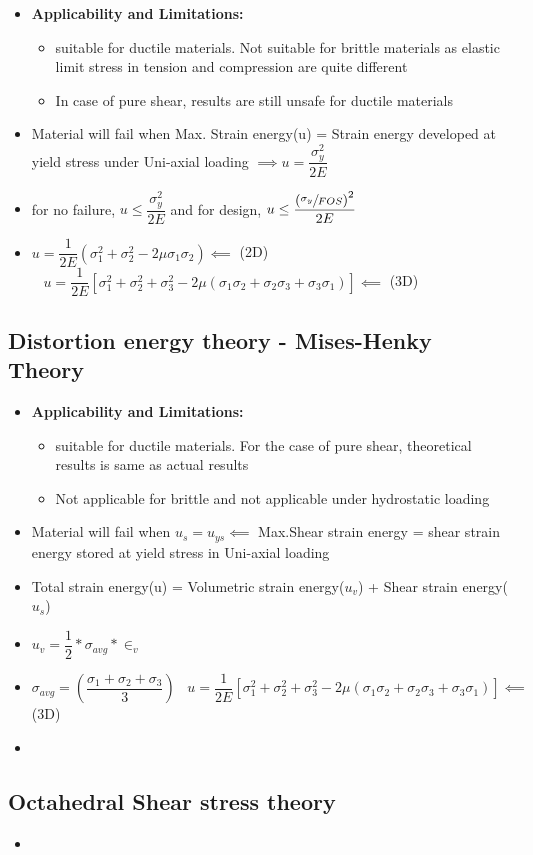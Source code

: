 \documentclass[8pt]{report}
\begin{document}
			\begin{itemize}
				\item \textbf{Applicability and Limitations:}
					\begin{itemize}
						\item suitable for ductile materials. Not suitable for brittle materials as elastic limit stress in tension and compression are quite different
						\item In case of pure shear, results are still unsafe for ductile materials
					\end{itemize}
				\item Material will fail when Max. Strain energy(u) = Strain energy developed at yield stress under Uni-axial loading $\implies \boxed{u = \dfrac{\sigma_y^2}{2E}}$
				\item for no failure, $u\le\dfrac{\sigma_y^2}{2E}$ and for design, $u\le\dfrac{\left(\sfrac{\sigma_y}{FOS}\right)^2}{2E}$
				\item $\boxed{u = \dfrac{1}{2E}(\sigma_1^2+\sigma_2^2-2\mu\sigma_1\sigma_2)} \impliedby$ (2D) $\;\;\;\boxed{u = \dfrac{1}{2E}\left[\sigma_1^2+\sigma_2^2+\sigma_3^2-2\mu(\sigma_1\sigma_2+\sigma_2\sigma_3+\sigma_3\sigma_1)\right]} \impliedby$ (3D)
			\end{itemize}\hrulefill
		\subsection{Distortion energy theory - Mises-Henky Theory}
			\begin{itemize}
				\item \textbf{Applicability and Limitations:}
				\begin{itemize}
					\item suitable for ductile materials. For the case of pure shear, theoretical results is same as actual results
					\item Not applicable for brittle and not applicable under hydrostatic loading
				\end{itemize}
				\item Material will fail when $u_s=u_{ys} \impliedby$ Max.Shear strain energy = shear strain energy stored at yield stress in Uni-axial loading
				\item Total strain energy(u) = Volumetric strain energy($u_v$) + Shear strain energy($u_s$)
				\item $\boxed{u_v = \dfrac{1}{2}*\sigma_{avg}*\in_v}\;\;\;$ 
				\item $\boxed{\sigma_{avg} = \left(\dfrac{\sigma_1+\sigma_2+\sigma_3}{3}\right)}\;\;\;\boxed{u = \dfrac{1}{2E}\left[\sigma_1^2+\sigma_2^2+\sigma_3^2-2\mu(\sigma_1\sigma_2+\sigma_2\sigma_3+\sigma_3\sigma_1)\right]} \impliedby$ (3D)
				\item 
			\end{itemize}\hrulefill
		\subsection{Octahedral Shear stress theory}
			\begin{itemize}
				\item
			\end{itemize}\hrulefill
\end{document}
